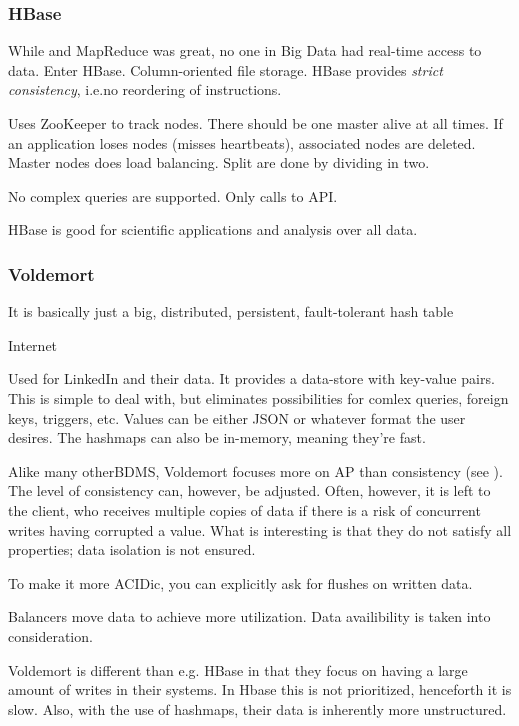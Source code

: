 \subsubsection{HBase}\label{sec:HBase}
While  and MapReduce was great, no one in Big Data
had real-time access to data. Enter HBase. Column-oriented file storage.
HBase provides \textit{strict consistency}, i.e.\@ no reordering of instructions.

Uses ZooKeeper to track nodes. There should be one master alive at all times.
If an application loses nodes (misses heartbeats), associated nodes are deleted.
Master nodes does load balancing.  Split are done by dividing in two.

No complex queries are supported. Only calls to API. 

HBase is good for scientific applications and analysis over all data.

\subsubsection{Voldemort}\label{sec:voldemort}
\epigraph{It is basically just a big, distributed, persistent, fault-tolerant hash table}{Internet}

Used for LinkedIn and their data. It provides a data-store with key-value
pairs. This is simple to deal with, but eliminates possibilities for comlex
queries, foreign keys, triggers, etc.  Values can be either JSON or whatever format the user desires.
The hashmaps can also be in-memory, meaning they're fast.

Alike many otherBDMS, Voldemort focuses more on AP than
consistency (see ). The level of consistency can,
however, be adjusted. Often, however, it is left to the client, who receives multiple
copies of data if there is a risk of concurrent writes having corrupted a value.
What is interesting is that they do not satisfy all
 properties; data isolation is not ensured. 

To make it more ACIDic, you can explicitly ask for flushes on written data.

Balancers move data to achieve more utilization. Data availibility is taken into consideration.

Voldemort is different than e.g. HBase in that they focus on having a large
amount of writes in their systems.  In Hbase this is not prioritized,
henceforth it is slow. Also, with the use of hashmaps, their data is inherently
more unstructured.

